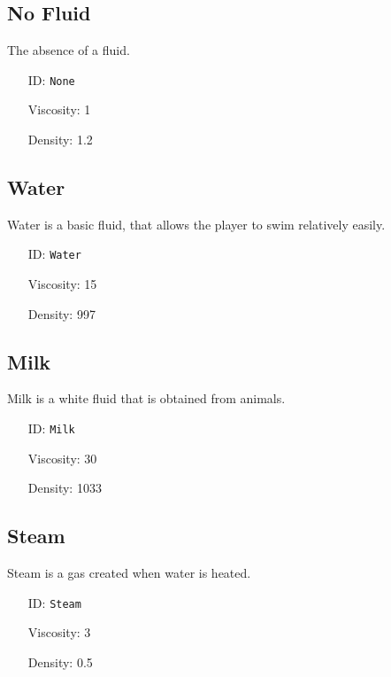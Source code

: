 \subsection{No Fluid}\label{subsec:fluids_no fluid}
The absence of a fluid.
\newline
\begin{itemize}[nosep]
    \item[ID:] \texttt{None}
    \item[Viscosity:] 1
    \item[Density:] 1.2
\end{itemize}

\subsection{Water}\label{subsec:fluids_water}
Water is a basic fluid, that allows the player to swim relatively easily.
\newline
\begin{itemize}[nosep]
    \item[ID:] \texttt{Water}
    \item[Viscosity:] 15
    \item[Density:] 997
\end{itemize}

\subsection{Milk}\label{subsec:fluids_milk}
Milk is a white fluid that is obtained from animals.
\newline
\begin{itemize}[nosep]
    \item[ID:] \texttt{Milk}
    \item[Viscosity:] 30
    \item[Density:] 1033
\end{itemize}

\subsection{Steam}\label{subsec:fluids_steam}
Steam is a gas created when water is heated.
\newline
\begin{itemize}[nosep]
    \item[ID:] \texttt{Steam}
    \item[Viscosity:] 3
    \item[Density:] 0.5
\end{itemize}

